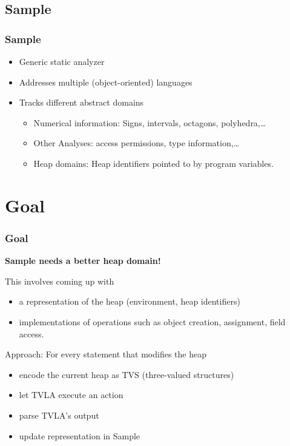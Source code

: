 \documentclass [xcolor=svgnames]{beamer} %
\begin{document}
\subsection{Sample} 
\begin{frame}
\frametitle{Sample}
\begin{itemize}
  \item Generic static analyzer
  \item Addresses multiple (object-oriented) languages
  \item Tracks different \textcolor{pacificblue}{abstract domains}
    \begin{itemize}
      \item Numerical information: Signs, intervals, octagons, polyhedra,\ldots
      \item Other Analyses: access permissions, type information,\ldots
      \item Heap domains: Heap identifiers pointed to by program variables.
    \end{itemize}
\end{itemize}
\pause
{}
\end{frame}

\section{Goal}
\begin{frame}
\frametitle{Goal}
\textbf{Sample needs a better heap domain!}

This involves coming up with
\begin{itemize}
  \item a representation of the heap (environment, heap identifiers)
  \item implementations of operations such as object creation, assignment, field access. 
\end{itemize}

\pause

Approach: For every statement that modifies the heap
\begin{itemize}
  \item encode the current heap as TVS (three-valued structures)
  \item let TVLA execute an action
  \item parse TVLA's output
  \item update representation in Sample

\end{itemize}
\end{frame}
\end{document}
